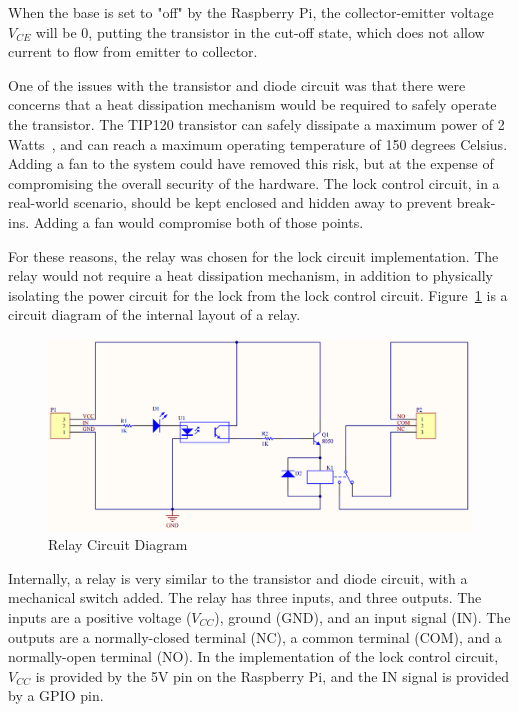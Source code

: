 \documentclass[12pt]{report}
\begin{document}
When the base is set to "off" by the Raspberry Pi, the collector-emitter voltage $V_{CE}$ will be 0, putting the 
transistor in the cut-off state, which does not allow current to flow from emitter to collector.

One of the issues with the transistor and diode circuit was that there were concerns that a heat dissipation mechanism 
would be required to safely operate the transistor. The TIP120 transistor can safely dissipate a maximum power of 2 
Watts~\autocite{TIP120}, and can reach a maximum operating temperature of 150 degrees Celsius. Adding a fan to the 
system could have removed this risk, but at the expense of compromising the overall security of the hardware. The lock 
control circuit, in a real-world scenario, should be kept enclosed and hidden away to prevent break-ins. Adding a fan 
would compromise both of those points.

For these reasons, the relay was chosen for the lock circuit implementation. The relay would not require a heat 
dissipation mechanism, in addition to physically isolating the power circuit for the lock from the lock control 
circuit. Figure~\ref{fig:relay-circuit-diagram} is a circuit diagram of the internal layout of a relay.

\begin{figure}
    \includegraphics[width=\textwidth]{Diagrams/Hardware-Diagrams/relay_circuit}
    \caption{Relay Circuit Diagram~\autocite{RELAYCIRCUIT}}
    \label{fig:relay-circuit-diagram}
\end{figure}

Internally, a relay is very similar to the transistor and diode circuit, with a mechanical switch added. The relay 
has three inputs, and three outputs. The inputs are a positive voltage ($ V_{CC} $), ground (GND), and an input signal 
(IN). The outputs are a normally-closed terminal (NC), a common terminal (COM), and a normally-open terminal (NO). In 
the implementation of the lock control circuit, $ V_{CC} $ is provided by the 5V pin on the Raspberry Pi, and the IN
signal is provided by a GPIO pin.
\end{document}

